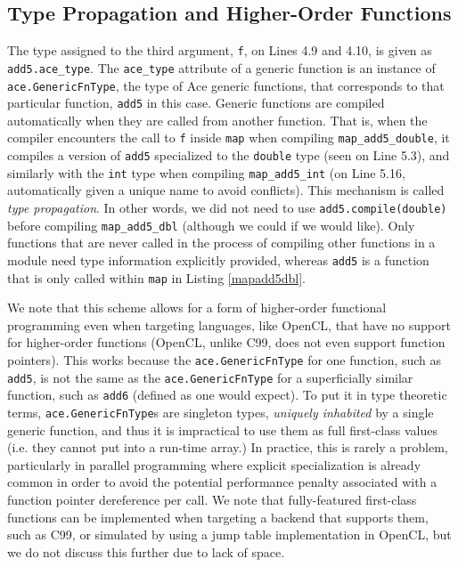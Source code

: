 \documentclass[10pt]{sigplanconf}
\begin{document}
\subsection{Type Propagation and Higher-Order Functions}
The type assigned to the third argument, \verb|f|, on Lines 4.9 and 4.10, is given as \verb|add5.ace_type|. The \verb|ace_type| attribute of a generic function is an instance of \verb|ace.GenericFnType|, the type of Ace generic functions, that corresponds to that particular function, \verb|add5| in this case. Generic functions are compiled automatically when they are called from another function. That is, when the compiler encounters the call to \verb|f| inside \verb|map| when compiling \verb|map_add5_double|, it compiles a version of \verb|add5| specialized to the \verb|double| type (seen on Line 5.3), and similarly with the \verb|int| type when compiling \verb|map_add5_int| (on Line 5.16, automatically given a unique name to avoid conflicts). This mechanism is called {\em type propagation}. In other words, we did not need to use \verb|add5.compile(double)| before compiling \verb|map_add5_dbl| (although we could if we would like). Only functions that are never called in the process of compiling other functions in a module need type information explicitly provided, whereas \verb|add5| is a function that is only called within \verb|map| in Listing \ref{mapadd5dbl}. 

We note that this scheme allows for a form of higher-order functional programming even when targeting languages, like OpenCL, that have no support for higher-order functions (OpenCL, unlike C99, does not even support function pointers). This works because the \verb|ace.GenericFnType| for one function, such as \verb|add5|, is not the same as the \verb|ace.GenericFnType| for a superficially similar function, such as \verb|add6| (defined as one would expect). To put it in type theoretic terms, \verb|ace.GenericFnType|s are singleton types, {\em uniquely inhabited} by a single generic function, and thus it is impractical to use them as full first-class values (i.e. they cannot put into a run-time array.) In practice, this is rarely a problem, particularly in parallel programming where explicit specialization is already common in order to avoid the potential performance penalty associated with a function pointer dereference per call.
We note that fully-featured first-class functions can be implemented when targeting a backend that supports them, such as C99, or simulated by using a jump table implementation in OpenCL, but we do not discuss this further due to lack of space.
\end{document}
